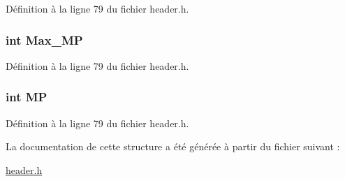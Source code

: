 Définition à la ligne 79 du fichier header.\+h.

\hypertarget{structt__status_a5e48a681ff3d92aaa0e643fbc32ab2f7}{
\subsubsection[{Max\+\_\+\+M\+P}]{\setlength{\rightskip}{0pt plus 5cm}int Max\+\_\+\+M\+P}}\label{structt__status_a5e48a681ff3d92aaa0e643fbc32ab2f7}


Définition à la ligne 79 du fichier header.\+h.

\hypertarget{structt__status_a30fc75b90111fc791752dd1add6ed991}{
\subsubsection[{M\+P}]{\setlength{\rightskip}{0pt plus 5cm}int M\+P}}\label{structt__status_a30fc75b90111fc791752dd1add6ed991}


Définition à la ligne 79 du fichier header.\+h.



La documentation de cette structure a été générée à partir du fichier suivant \+:\begin{DoxyCompactItemize}
\item 
\hyperlink{header_8h}{header.\+h}\end{DoxyCompactItemize}
